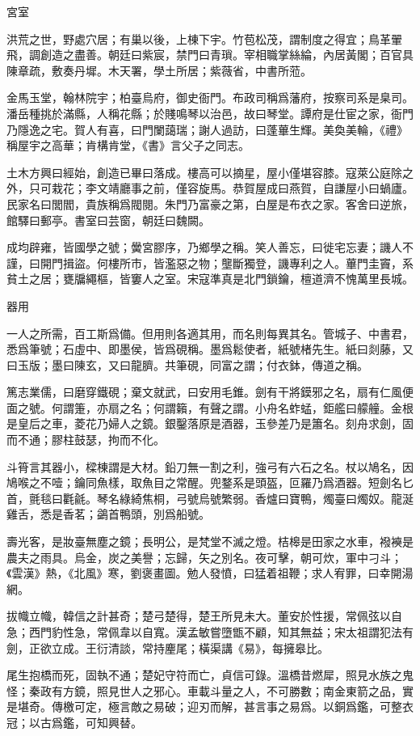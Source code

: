 \documentclass[12pt,a4paper]{ctexbook}
\begin{document}
宮室\par
洪荒之世，野處穴居；有巢以後，上棟下宇。竹苞松茂，謂制度之得宜；鳥革翬飛，調創造之盡善。朝廷曰紫宸，禁門曰青瑣。宰相職掌絲綸，內居黃閣；百官具陳章疏，敷奏丹墀。木天署，學土所居；紫薇省，中書所蒞。\par
金馬玉堂，翰林院宇；柏臺烏府，御史衙門。布政司稱爲藩府，按察司系是臬司。潘岳種挑於滿縣，人稱花縣；於賤鳴琴以治邑，故曰琴堂。譚府是仕宦之家，衙門乃隱逸之宅。賀人有喜，曰門闌藹瑞；謝人過訪，曰蓬蓽生輝。美奐美輪，《禮》稱屋宇之高華；肯構肯堂，《書》言父子之同志。\par
土木方興曰經始，創造已畢曰落成。樓高可以摘星，屋小僅堪容膝。寇萊公庭除之外，只可栽花；李文靖廳事之前，僅容旋馬。恭賀屋成曰燕賀，自謙屋小曰蝸廬。民家名曰閭閻，貴族稱爲閥閱。朱門乃富豪之第，白屋是布衣之家。客舍曰逆旅，館驛曰郵亭。書室曰芸窗，朝廷曰魏闕。\par
成均辟雍，皆國學之號；黌宮膠序，乃鄉學之稱。笑人善忘，曰徙宅忘妻；譏人不謹，曰開門揖盜。何樓所市，皆濫惡之物；壟斷獨登，譏專利之人。蓽門圭竇，系貧土之居；甕牖繩樞，皆窶人之室。宋寇準真是北門鎖鑰，檀道濟不愧萬里長城。\par
器用\par
一人之所需，百工斯爲備。但用則各適其用，而名則每異其名。管城子、中書君，悉爲筆號；石虛中、即墨侯，皆爲硯稱。墨爲鬆使者，紙號楮先生。紙曰剡藤，又曰玉版；墨曰陳玄，又曰龍臍。共筆硯，同富之謂；付衣鉢，傳道之稱。\par
篤志業儒，曰磨穿鐵硯；棄文就武，曰安用毛錐。劍有干將鏌邪之名，扇有仁風便面之號。何謂箑，亦扇之名；何謂籟，有聲之謂。小舟名蚱蜢，鉅艦曰艨艟。金根是皇后之車，菱花乃婦人之鏡。銀鑿落原是酒器，玉參差乃是簫名。刻舟求劍，固而不通；膠柱鼓瑟，拘而不化。\par
斗筲言其器小，樑棟謂是大材。鉛刀無一割之利，強弓有六石之名。杖以鳩名，因鳩喉之不噎；鑰同魚樣，取魚目之常醒。兜鍪系是頭盔，叵羅乃爲酒器。短劍名匕首，氈毯曰氍毹。琴名綠綺焦桐，弓號烏號繁弱。香爐曰寶鴨，燭臺曰燭奴。龍涎雞舌，悉是香茗；鷁首鴨頭，別爲船號。\par
壽光客，是妝臺無塵之鏡；長明公，是梵堂不滅之燈。桔槔是田家之水車，襏襫是農夫之雨具。烏金，炭之美譽；忘歸，矢之別名。夜可擊，朝可炊，軍中刁斗；《雲漢》熱，《北風》寒，劉褒畫圖。勉人發憤，曰猛着祖鞭；求人宥罪，曰幸開湯網。\par
拔幟立幟，韓信之計甚奇；楚弓楚得，楚王所見未大。董安於性援，常佩弦以自急；西門豹性急，常佩韋以自寬。漢孟敏嘗墮甑不顧，知其無益；宋太祖謂犯法有劍，正欲立成。王衍清談，常持麈尾；橫渠講《易》，每擁皋比。\par
尾生抱橋而死，固執不通；楚妃守符而亡，貞信可錄。溫橋昔燃犀，照見水族之鬼怪；秦政有方鏡，照見世人之邪心。車載斗量之人，不可勝數；南金東箭之品，實是堪奇。傳檄可定，極言敵之易破；迎刃而解，甚言事之易爲。以銅爲鑑，可整衣冠；以古爲鑑，可知興替。\par
\end{document}
